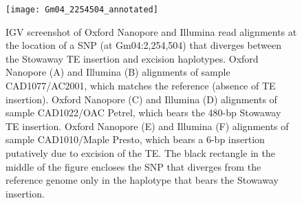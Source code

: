 \documentclass[12pt]{article}
\newenvironment{lsfigure}
	{\begin{landscape} \begin{figure} \centering}
	{\end{figure} \end{landscape}}
\begin{document}
\begin{lsfigure}
	\texttt{[image: Gm04\_2254504\_annotated]}

	\caption[IGV screenshot of Oxford Nanopore and Illumina read alignments at the location of a SNP that diverges between the Stowaway TE insertion and excision haplotypes]{
		IGV screenshot of Oxford Nanopore and Illumina read alignments at the location of a SNP (at Gm04:2,254,504) that diverges between the Stowaway TE insertion and excision haplotypes.
		Oxford Nanopore (A) and Illumina (B) alignments of sample CAD1077/AC2001, which matches the reference (absence of TE insertion).
		Oxford Nanopore (C) and Illumina (D) alignments of sample CAD1022/OAC Petrel, which bears the 480-bp Stowaway TE insertion.
		Oxford Nanopore (E) and Illumina (F) alignments of sample CAD1010/Maple Presto, which bears a 6-bp insertion putatively due to excision of the TE.
		The black rectangle in the middle of the figure encloses the SNP that diverges from the reference genome only in the haplotype that bears the Stowaway insertion.
	}

	\label{fig_s21}

\end{lsfigure}

\clearpage%



\end{document}
